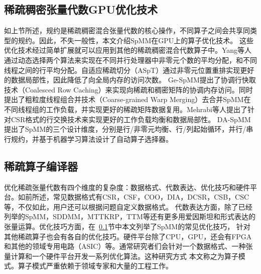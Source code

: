 \subsection{稀疏稠密张量代数GPU优化技术}\label{sec:spmmopt}
如上节所述，规约是稀疏稠密混合张量代数的核心操作，不同算子之间会共享同类型的规约。因此，不失一般性，本文介绍SpMM在GPU上的算子优化技术。
这些优化技术经过简单扩展就可以应用到其他的稀疏稠密混合代数算子中。Yang等人\cite{yang2018design}通过动态选择两个算法来实现在不同并行处理器中非零元个数的平均分配，和不同线程之间的行平均分配。自适应稀疏切分（ASpT）\cite{hong2019adaptive}通过非零元位置重排实现更好的数据局部性，因此降低了向全局内存的访问次数。
Ge-SpMM\cite{huang2020ge}提出了协调行快取技术（Coalesced Row Caching）来实现向稀疏和稠密矩阵的协调内存访问。同时提出了粗粒度线程组合并技术（Coarse-grained Warp Merging）去合并SpMM在不同线程组的工作负载，并实现更好的稀疏矩阵数据复用。Mehrabi等人\cite{mehrabi2021learning}提出了针对CSR格式的行交换技术来实现更好的工作负载均衡和数据局部性。
DA-SpMM\cite{dai2022heuristic}提出了SpMM的三个设计维度，分别是行/非零元均衡、行/列起始循环，并行/串行规约，并基于机器学习算法设计了自动算子选择器。

\subsection{稀疏算子编译器}\label{sec:spcomp}
优化稀疏张量代数有四个维度的复杂度：数据格式、代数表达、优化技巧和硬件平台。如前所述，常见数据格式有CSR，CSF，COO，DIA，DCSR，CSB，CSC等，不仅如此，用户还可以根据问题自定义数据格式。
代数表达方面，除了已经列举的SpMM，SDDMM，MTTKRP，TTM等还有更多用爱因斯坦和\cite{einsteinsum}形式表达的张量运算。优化技巧方面，在~\ref{sec:spmmopt}节中本文列举了SpMM的常见优化技巧，
针对其他稀疏算子也会有各自的优化技巧。硬件平台除了CPU，GPU，还会有FPGA和其他的领域专用电路（ASIC）等。通常研究者们会针对一个数据格式、一种张量计算和一个硬件平台开发一系列优化算法。这种研究方式
本文称之为算子模式。算子模式严重依赖于领域专家和大量的工程工作\cite{wang2014mkl,naumov2010cusparse,guennebaud2010eigen}。

